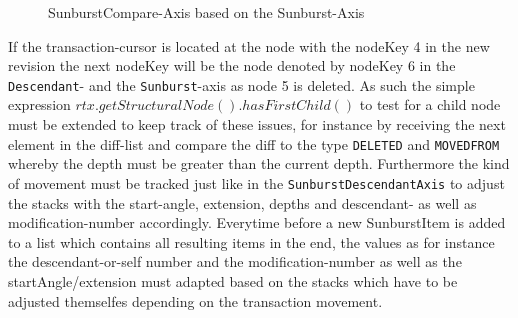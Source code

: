 \begin{figure}[tb]
\caption{\label{fig:tree-axis} SunburstCompare-Axis based on the Sunburst-Axis}
\end{figure}

If the transaction-cursor is located at the node with the nodeKey 4 in the new revision the next nodeKey will be the node denoted by nodeKey 6 in the \texttt{Descendant}- and the \texttt{Sunburst}-axis as node 5 is deleted. As such the simple expression $rtx.getStructuralNode().hasFirstChild()$ to test for a child node must be extended to keep track of these issues, for instance by receiving the next element in the diff-list and compare the diff to the type \texttt{DELETED} and \texttt{MOVEDFROM} whereby the depth must be greater than the current depth. Furthermore the kind of movement must be tracked just like in the \texttt{SunburstDescendantAxis} to adjust the stacks with the start-angle, extension, depths and descendant- as well as modification-number accordingly. Everytime before a new SunburstItem is added to a list which contains all resulting items in the end, the values as for instance the descendant-or-self number and the modification-number as well as the startAngle/extension must adapted based on the stacks which have to be adjusted themselfes depending on the transaction movement. 

